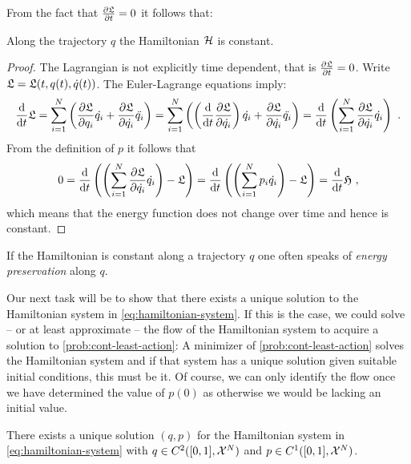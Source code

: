 From the fact that $\frac{\partial \mathfrak{L}}{\partial t} = 0$ it follows that:
\begin{corollary}
	\label{cor:energy-preservation}
	Along the trajectory $q$ the Hamiltonian $\mathcal{H}$ is constant.
\end{corollary}
\begin{proof}
	The Lagrangian is not explicitly time dependent, that is $\frac{\partial \mathfrak{L}}{\partial t} = 0$.
	Write $\mathfrak{L} = \mathfrak{L}(t, q(t), \dot{q}(t))$.
	The Euler-Lagrange equations imply:
	\begin{equation}
		\frac{\mathrm{d}}{\mathrm{d} t} \mathfrak{L} = \sum_{i=1}^{N}\left(\frac{\partial \mathfrak{L}}{\partial q_i} \dot{q_i} + \frac{\partial \mathfrak{L}}{\partial \dot{q_i}} \ddot{q_i} \right )
		=\sum_{i=1}^{N}\left( \left( \frac{\mathrm{d}}{\mathrm{d} t} \frac{\partial \mathfrak{L}}{\partial \dot{q_i}} 
		\right)\dot{q_i}+ \frac{\partial \mathfrak{L}}{\partial \dot{q_i}} \ddot{q_i}\right )
		= \frac{\mathrm{d}}{\mathrm{d} t} \left(\sum_{i=1}^{N} \frac{\partial \mathfrak{L}}{\partial \dot{q_i}} \dot{q_i}\right) \ .
	\end{equation}
	From the definition of $p$ it follows that
	\begin{equation}
		0 = \frac{\mathrm{d}}{\mathrm{d} t} \left( \left(\sum_{i=1}^{N} \frac{\partial \mathfrak{L}}{\partial \dot{q_i}} \dot{q_i} \right) -  \mathfrak{L} \right) 
		= \frac{\mathrm{d}}{\mathrm{d} t} \left( \left(\sum_{i=1}^{N} p_i \dot{q_i} \right ) - \mathfrak{L} \right)
		= \frac{\mathrm{d}}{\mathrm{d} t} \mathfrak{H} \ ,
	\end{equation}
	which means that the energy function does not change over time and hence is constant.
\end{proof}
If the Hamiltonian is constant along a trajectory $q$ one often speaks of \emph{energy preservation} along $q$.

Our next task will be to show that there exists a unique solution to the Hamiltonian system in \cref{eq:hamiltonian-system}.
If this is the case, we could solve -- or at least approximate -- the flow of the Hamiltonian system to acquire a solution to \cref{prob:cont-least-action}:
A minimizer of \cref{prob:cont-least-action} solves the Hamiltonian system and if that system has a unique solution given suitable initial conditions, this must be it.
Of course, we can only identify the flow once we have determined the value of $p(0)$ as otherwise we would be lacking an initial value.

\begin{theorem}
	\label{theo:hamiltonian-system-solution}
	There exists a unique solution $(q, p)$ for the Hamiltonian system in \cref{eq:hamiltonian-system} with $q \in C^2([0, 1], \mathcal{X}^N)$ and $p \in C^1([0, 1], \mathcal{X}^N)$.
\end{theorem}

